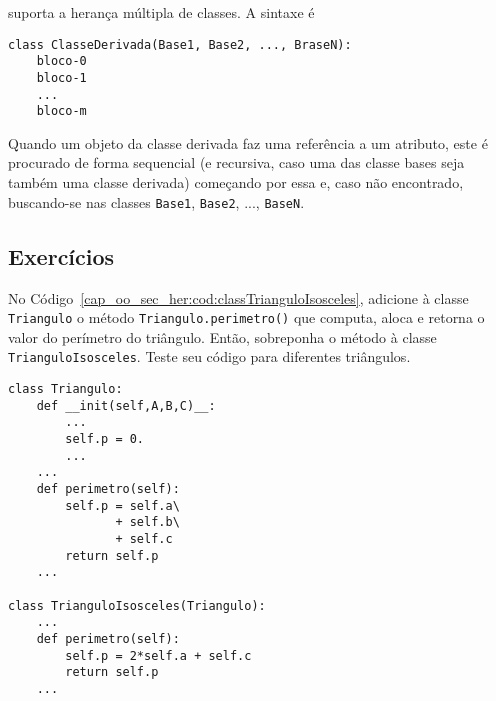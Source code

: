 \begin{obs}
  {\python} suporta a herança múltipla de classes. A sintaxe é
\begin{lstlisting}
class ClasseDerivada(Base1, Base2, ..., BraseN):
    bloco-0
    bloco-1
    ...
    bloco-m
\end{lstlisting}
  Quando um objeto da classe derivada faz uma referência a um atributo, este é procurado de forma sequencial (e recursiva, caso uma das classe bases seja também uma classe derivada) começando por essa e, caso não encontrado, buscando-se nas classes \lstinline+Base1+, \lstinline+Base2+, ..., \lstinline+BaseN+.
\end{obs}

\subsection{Exercícios}

\begin{exer}
  No Código~\ref{cap_oo_sec_her:cod:classTrianguloIsosceles}, adicione à classe \lstinline+Triangulo+ o método \lstinline+Triangulo.perimetro()+ que computa, aloca e retorna o valor do perímetro do triângulo. Então, sobreponha o método à classe \lstinline+TrianguloIsosceles+. Teste seu código para diferentes triângulos.
\end{exer}
\begin{resp}
\begin{lstlisting}
class Triangulo:
    def __init(self,A,B,C)__:
        ...
        self.p = 0.
        ...
    ...
    def perimetro(self):
        self.p = self.a\
               + self.b\
               + self.c
        return self.p
    ...

class TrianguloIsosceles(Triangulo):
    ...
    def perimetro(self):
        self.p = 2*self.a + self.c
        return self.p
    ...
\end{lstlisting}
\end{resp}

